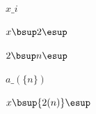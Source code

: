 \documentclass[a4paper,10pt,fleqn]{article}
\begin{document}
\noindent
$x\_i$


\noindent
$x \bsup 2 \esup$


\noindent
$2 \bsup n \esup$


\noindent
$a\_(\{n\})$


\noindent
$x \bsup \{2(n)\} \esup$
\end{document}
